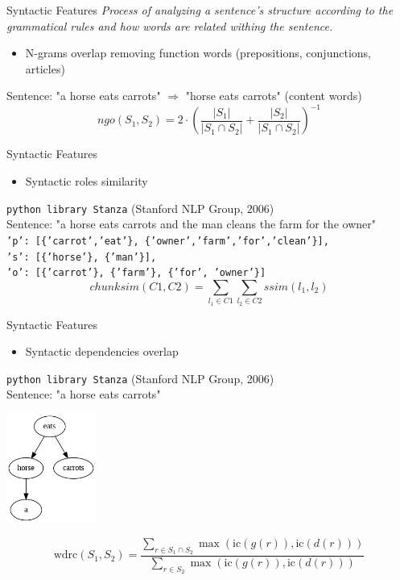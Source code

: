 \begin{frame}{Syntactic Features}
    \textit{Process of analyzing a sentence's structure according to the grammatical rules and how words are related withing 
    the sentence.}
    \vspace{1cm}
    \begin{itemize}
        \item N-grams overlap removing function words (prepositions, conjunctions, articles)
    \end{itemize}
    \vspace{1cm}
    Sentence: "a horse eats carrots" $\Rightarrow$ "horse eats carrots" (content words)
         \[ ngo(S_1, S_2) = 2 \cdot \left( \frac{|S_1|}{|S_1 \cap S_2|} + \frac{|S_2|}{|S_1 \cap S_2|} \right)^{-1} \]
\end{frame}

\begin{frame}{Syntactic Features}
    \begin{itemize}
        \item Syntactic roles similarity 
    \end{itemize}
    \vspace{0.3cm}
    \texttt{python library Stanza} (Stanford NLP Group, 2006)\\ \vspace{0.1cm}
    Sentence: "a horse eats carrots and the man cleans the farm for the owner" \\ \vspace{0.1cm}
    \texttt{'p': [\{'carrot','eat'\}, \{'owner','farm','for','clean'\}],
    \\ 's': [\{'horse'\}, \{'man'\}], 
    \\ 'o': [\{'carrot'\}, \{'farm'\}, \{'for', 'owner'\}]}
         \[ chunksim(C1, C2) = \sum_{ l_1 \in C1} \sum_{l_2 \in C2}  ssim(l_1, l_2) \]
\end{frame}

\begin{frame}{Syntactic Features}
    \begin{itemize}
        \item Syntactic dependencies overlap
    \end{itemize}
    \vspace{0.2cm}
    \texttt{python library Stanza} (Stanford NLP Group, 2006) \\
    Sentence: "a horse eats carrots" \\
    \begin{center}
        \includegraphics[width=0.22\textwidth]{figures/dependency_tree.png}
    \end{center}
        \[ \text{wdrc}(S_1, S_2) = \frac{\sum_{r \in S_1 \cap S_2} \max(\text{ic}(g(r)), \text{ic}(d(r)))}{\sum_{r \in S_2} 
\max(\text{ic}(g(r)), \text{ic}(d(r)))} \]
\end{frame}


